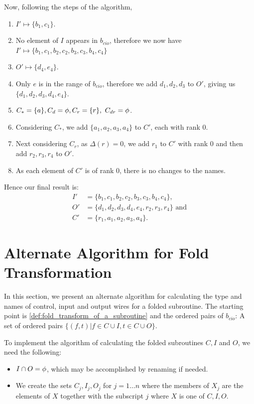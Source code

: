 Now, following the steps of the algorithm,
\begin{enumerate}
  \item $I' \mapsto \{b_1,c_1\}$.
  \item No element of $I$ appears in $b_{cio}$, therefore we now have
    $I' \mapsto \{b_1,c_1,b_2,c_2,b_3,c_3,b_4,c_4\}$
  \item $O' \mapsto \{d_4,e_4\}$.
  \item Only $e$ is in the range of $b_{cio}$, therefore we add
    $d_1,d_2,d_3$ to  $O'$, giving us $\{d_1,d_2,d_3,d_4,e_4\}$.
  \item $C_*=\{a\},C_d=\nothing, C_r = \{r\},\ C_{dr}=\nothing$.
  \item Considering $C_*$, we add $\{a_1,a_2,a_3,a_4\}$ to $C'$, each with rank 0.
  \item Next considering $C_r$, as $\Delta(r)=0$, we add $r_1$ to $C'$ with
    rank 0 and then add $r_2,r_3,r_4$ to $O'$.
  \item As each element of $C'$ is of rank 0, there is no changes to the names.
\end{enumerate}

Hence our final result is:
\begin{align*}
  I'&=\{b_1,c_1,b_2,c_2,b_3,c_3,b_4,c_4\},\\
  O'&=\{d_1,d_2,d_3,d_4,e_4,r_2,r_3,r_4\}\text{ and}\\
  C'&=\{r_1,a_1,a_2,a_3,a_4\}.
\end{align*}


\section{Alternate Algorithm for Fold Transformation} %
\label{sec:alternate_algorithm_for_fold_transformation}
In this section, we present an alternate algorithm for calculating the type and names of control,
input and output wires for a folded subroutine. The starting point is
\vref{def:fold_transform_of_a_subroutine} and the ordered pairs of $b_{cio}$: A set of ordered
pairs $\{(f,t)|f\in C\cup I, t \in C\cup O\}$.

To implement the algorithm of calculating the folded subroutines $C,I$ and $O$, we need the
following:
\begin{itemize}
  \item $I\cap O = \phi$, which may be accomplished by renaming if needed.
  \item We create the sets $C_j,I_j,O_j$ for $j=1\ldots n$ where the members
    of $X_j$ are the elements of $X$ together with the subscript $j$ where
    $X$ is one of $C,I,O$.
\end{itemize}

